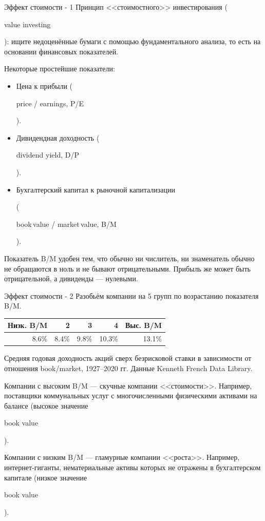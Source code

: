 \documentclass{beamer}
\newcommand{\en}[1]{\begin{otherlanguage}{english}#1\end{otherlanguage}}
\begin{document}
\begin{frame}{Эффект стоимости - 1}
\justify
Принцип <<стоимостного>> инвестирования (\en{value investing}): ищите 
недоценённые бумаги с помощью фундаментального анализа, то есть на основании
финансовых показателей.

\justify
Некоторые простейшие показатели:
\begin{itemize}
\justifying
\item Цена к прибыли (\en{price / earnings, P/E}).
\item Дивидендная доходность (\en{dividend yield, D/P}).
\item Бухгалтерский капитал к рыночной капитализации

(\en{book\,value / market\,value, B/M}).
\end{itemize}

\justify
Показатель B/M удобен тем, что обычно ни числитель, ни знаменатель обычно не 
обращаются в ноль и не бывают отрицательными. Прибыль же может быть 
отрицательной, а дивиденды --- нулевыми.
\end{frame}




\begin{frame}{Эффект стоимости - 2}
\justify
Разобьём компании на 5 групп по возрастанию показателя B/M.

\justify
\centering
\begin{tabular}{r|r|r|r|r}
Низк. B/M &     2 &     3 &      4 & Выс. B/M \\ \hline
    8.6\% & 8.4\% & 9.8\% & 10.3\% &   13.1\% 
\end{tabular}

\centering
{\scriptsize Средняя годовая доходность акций сверх безрисковой ставки в
зависимости от отношения book/market, 1927--2020 гг. Данные Kenneth French 
Data Library.}

\justify
Компании с высоким B/M --- скучные компании <<стоимости>>. Например,
поставщики коммунальных услуг с многочисленными физическими активами на балансе
(высокое значение \en{book value}).

\justify
Компании с низким B/M --- гламурные компании <<роста>>. Например,
интернет-гиганты, нематериальные активы которых не отражены в бухгалтерском
капитале (низкое значение \en{book value}). 

\end{frame}
\end{document}
